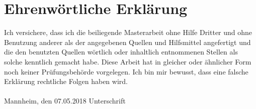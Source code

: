 \documentclass[a4,11pt,titlepage,oneside,openany]{book}
\begin{document}



\newpage\null\thispagestyle{empty}\newpage



\newpage\null\thispagestyle{empty}\newpage


\tableofcontents

\listofalgorithms

\listoffigures

\listoftables

\lstlistoflistings



\newpage




\printbibliography

\appendix


\newpage

\pagestyle{empty}

\section*{Ehrenw\"ortliche Erkl\"arung}
Ich versichere, dass ich die beiliegende Masterarbeit ohne Hilfe Dritter
und ohne Benutzung anderer als der angegebenen Quellen und Hilfsmittel
angefertigt und die den benutzten Quellen w\"ortlich oder inhaltlich
entnommenen Stellen als solche kenntlich gemacht habe. Diese Arbeit
hat in gleicher oder \"ahnlicher Form noch keiner Pr\"ufungsbeh\"orde
vorgelegen. Ich bin mir bewusst, dass eine falsche Erkl\"arung rechtliche Folgen haben
wird.
\\
\\

\noindent
Mannheim, den 07.05.2018 \hspace{4cm} Unterschrift
\end{document}
